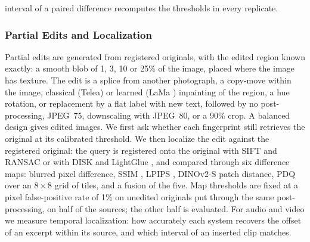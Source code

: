interval of a paired difference recomputes the thresholds in every replicate.

\subsubsection{Partial Edits and Localization}
Partial edits are generated from  registered originals, with the edited region known exactly: a smooth blob of 1, 3, 10 or 25\% of the image, placed where the image has texture. The edit is a splice from another photograph, a copy-move within the image, classical (Telea) or learned (LaMa \cite{suvorov2022lama}) inpainting of the region, a hue rotation, or replacement by a flat label with new text, followed by no post-processing, JPEG~75, downscaling with JPEG~80, or a 90\% crop. A balanced design gives  edited images. We first ask whether each fingerprint still retrieves the original at its calibrated threshold. We then localize the edit against the registered original: the query is registered onto the original with SIFT and RANSAC \cite{lowe2004sift, fischler1981ransac} or with DISK and LightGlue \cite{tyszkiewicz2020disk, lindenberger2023lightglue}, and compared through six difference maps: blurred pixel difference, SSIM \cite{wang2004ssim}, LPIPS \cite{zhang2018lpips}, DINOv2-S patch distance, PDQ over an $8 \times 8$ grid of tiles, and a fusion of the five. Map thresholds are fixed at a pixel false-positive rate of 1\% on unedited originals put through the same post-processing, on half of the sources; the other half is evaluated. For audio and video we measure temporal localization: how accurately each system recovers the offset of an excerpt within its source, and which interval of an inserted clip matches.

